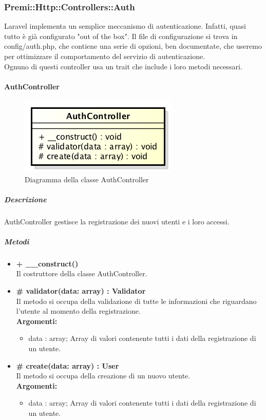 \newpage
\subsubsection{Premi::Http::Controllers::Auth}
Laravel implementa un semplice meccanismo di autenticazione. Infatti, quasi tutto è già configurato "out of the box". Il file di configurazione si trova in config/auth.php, che contiene una serie di opzioni, ben documentate, che useremo per ottimizzare il comportamento del servizio di autenticazione.\\
Ognuno di questi controller usa un trait che include i loro metodi necessari.
	\paragraph{AuthController}
	\begin{figure}[h]
\centering
\includegraphics[width=0.5\linewidth]{img/back_end_http_controllers_authController}
\caption[Diagramma della classe AuthController]{Diagramma della classe AuthController}
\label{fig:back_end_http_controllers_authController}
\end{figure}
		\subparagraph{Descrizione}
			AuthController gestisce la registrazione dei nuovi utenti e i loro accessi.
		\subparagraph{Metodi}
			\begin{itemize}
				\item \textbf{+ \_\_construct()}\\
				Il costruttore della classe AuthController.
				\item \textbf{\# validator(data: array) : Validator}\\
				Il metodo si occupa della validazione di tutte le informazioni che riguardano l'utente al momento della registrazione.\\
					\textbf{Argomenti:}
						\begin{itemize}
							\item data : array;
							Array di valori contenente tutti i dati della registrazione di un utente. 
						\end{itemize}
				\item \textbf{\# create(data: array) : User}\\
				Il metodo si occupa della creazione di un nuovo utente.\\
					\textbf{Argomenti:}
						\begin{itemize}
							\item data : array;
							Array di valori contenente tutti i dati della registrazione di un utente.
						\end{itemize}
			\end{itemize}
			
